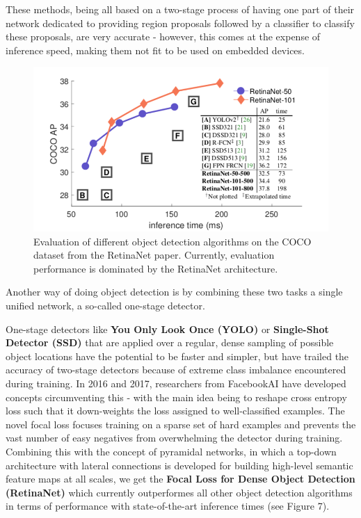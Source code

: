 \documentclass[a4paper]{article}
\begin{document}
These methods, being all based on a two-stage process of having one part of their network dedicated to providing region proposals followed by a classifier to classify these proposals, are  very accurate - however, this comes at the expense of inference speed, making them not fit to be used on embedded devices.\\
\begin{figure}

\includegraphics[scale=0.32]{images/retinanet}
\caption{Evaluation of different object detection algorithms on the COCO dataset from the RetinaNet paper. Currently, evaluation performance is dominated by the RetinaNet architecture.}
\end{figure}
Another way of doing object detection is by combining these two tasks a single unified network, a so-called one-stage detector.



One-stage detectors like \textbf{You Only Look Once (YOLO)} \cite{DBLP:journals/corr/RedmonDGF15}\cite{DBLP:journals/corr/RedmonF16}\cite{DBLP:journals/corr/abs-1804-02767} or \textbf{Single-Shot Detector (SSD)} \cite{DBLP:journals/corr/LiuAESR15} that are applied over a regular, dense sampling of possible object locations have the potential to be faster and simpler, but have trailed the accuracy of two-stage detectors because of extreme class imbalance encountered during training.
In 2016 and 2017, researchers from FacebookAI have developed concepts \cite{DBLP:journals/corr/abs-1708-02002}\cite{DBLP:journals/corr/LinDGHHB16} circumventing this - with the main idea being to reshape cross entropy loss such that it down-weights the loss assigned to well-classified examples. The novel focal loss focuses training on a sparse set of hard examples and prevents the vast number of easy negatives from overwhelming the detector during training. Combining this with the concept of pyramidal networks, in which a top-down architecture with lateral connections is developed for building high-level semantic feature maps at all scales, we get the \textbf{Focal Loss for Dense Object Detection (RetinaNet)} which currently outperformes all other object detection algorithms in terms of performance with state-of-the-art inference times (see Figure 7).
\end{document}

